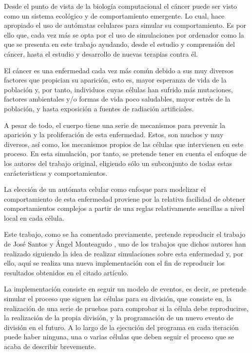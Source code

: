 Desde el punto de vista de la biología computacional el cáncer puede ser visto como un sistema ecológico y de comportamiento emergente.
Lo cual, hace apropiado el uso de autómatas celulares para simular su comportamiento. Es por ello que, cada vez más se opta por el uso
de simulaciones por ordenador como la que se presenta en este trabajo ayudando, desde el estudio y comprensión del cáncer, hasta
el estudio y desarrollo de nuevas terapias contra él.

El cáncer es una enfermedad cada vez más común debido a sus muy diversos factores que propician su aparición, esto es,
mayor esperanza de vida de la población y, por tanto, individuos cuyas células han sufrido más mutaciones, factores ambientales y/o
formas de vida poco saludables, mayor estrés de la población, y hasta exposición a fuentes de radiación artificiales.

A pesar de todo, el cuerpo tiene una serie de mecanismos para prevenir la aparición y la proliferación de esta enfermedad. Estos,
son muchos y muy diversos, así como, los mecanismos propios de las células que intervienen en este proceso. En esta simulación, por tanto,
se pretende tener en cuenta el enfoque de los autores del trabajo original, eligiendo sólo un subconjunto de todas estas
carácteristicas y comportamientos.

La elección de un autómata celular como enfoque para modelizar el comportamiento de esta enfermedad proviene por la relativa
facilidad de obtener comportamientos complejos a partir de una reglas relativamente sencillas a nivel local en cada célula.

Este trabajo, como se ha comentado previamente, pretende reproducir el trabajo de José Santos y Ángel Monteagudo \cite{jsantos-amonteagudo-1-2014},
uno de los trabajos \cite{jsantos-amonteagudo-2012} \cite{jsantos-amonteagudo-2013} \cite{jsantos-amonteagudo-2015} que dichos autores han realizado siguiendo la idea de realizar simulaciones sobre esta enfermedad y, por ello, aquí
se realiza una nueva implementación con el fin de reproducir los resultados obtenidos en el citado artículo.

La implementación consiste en seguir un modelo de eventos, es decir, se pretende simular el proceso que siguen las células para su división, que
consiste en, la realización de una serie de pruebas para comprobar si la célula debe reproducirse, la realización de la propia división, y
la programación de un nuevo evento de división en el futuro. A lo largo de la ejecución del programa en cada iteración puede haber ninguna, una o
varias células que deben seguir el proceso que se acaba de describir brevemente.


